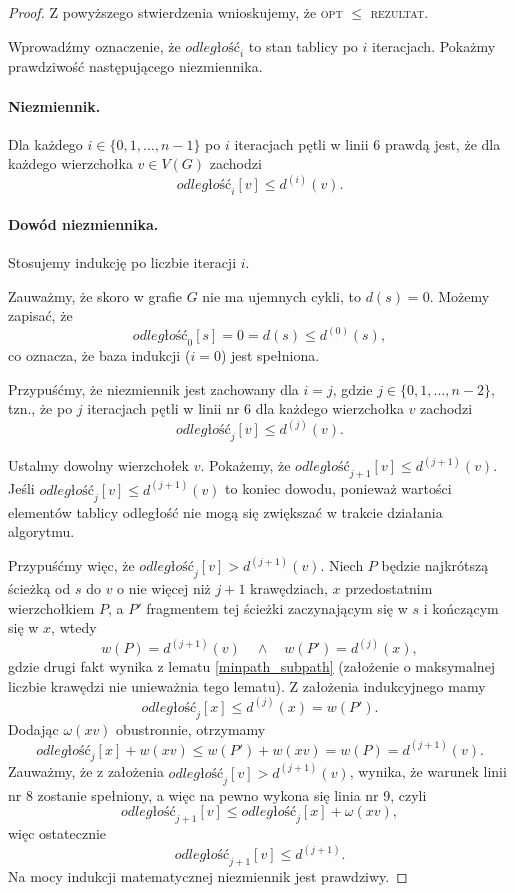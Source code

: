 \begin{theorem}
\begin{proof}
		Z powyższego stwierdzenia wnioskujemy, że
		\textsc{opt} $\leq$ \textsc{rezultat}. 
		
		Wprowadźmy oznaczenie, że $\textit{odległość}_i$ to 
		stan tablicy po $i$ iteracjach.
		Pokażmy prawdziwość następującego 
		niezmiennika. 
		
		\paragraph{Niezmiennik.} Dla każdego 
		$i \in \{0,1, \dots, n-1\}$ po $i$ iteracjach
		pętli w linii 6 prawdą jest, że dla każdego 
		wierzchołka $v \in V(G)$ zachodzi
		\[\textit{odległość}_i[v] \leq d^{(i)}(v).\]
		
		\paragraph{Dowód niezmiennika.} Stosujemy indukcję
		po liczbie iteracji $i$. 
		
		Zauważmy, że skoro w grafie $G$ nie ma ujemnych 
		cykli, to $d(s) = 0$. Możemy zapisać, że
		\[\textit{odległość}_0[s] = 0 = d(s) \leq d^{(0)}(s),\]
		co oznacza, że baza indukcji ($i=0$) jest spełniona.
		
		Przypuśćmy, że niezmiennik jest zachowany dla $i=j$,
		gdzie $j\in \{0, 1, \dots, n-2\}$, tzn., że po $j$
		iteracjach pętli w linii nr 6 dla każdego wierzchołka
		$v$ zachodzi
		\[\textit{odległość}_j[v] \leq d^{(j)}(v).\]
		
		Ustalmy dowolny wierzchołek $v$. Pokażemy, że
		$\textit{odległość}_{j+1}[v] \leq d^{(j+1)}(v)$. Jeśli
		$\textit{odległość}_j[v] \leq d^{(j+1)}(v)$ to koniec dowodu, 
		ponieważ wartości elementów tablicy odległość
		nie mogą się zwiększać w trakcie działania algorytmu.
		
		Przypuśćmy więc, że $\textit{odległość}_j[v] > d^{(j+1)}(v)$.
		Niech $P$ będzie najkrótszą ścieżką od $s$ do $v$
		o nie więcej niż $j+1$ krawędziach, $x$ przedostatnim 
		wierzchołkiem $P$, a $P'$ fragmentem tej ścieżki
		zaczynającym się w $s$ i kończącym się w $x$, wtedy
		\[w(P) = d^{(j+1)}(v) \quad \land \quad w(P') = d^{(j)}(x),\]
		gdzie drugi fakt wynika z lematu \ref{minpath_subpath} (założenie o maksymalnej liczbie krawędzi nie unieważnia
		tego lematu).
		Z założenia indukcyjnego mamy
		\[\textit{odległość}_j[x] \leq d^{(j)}(x)=w(P').\]
		Dodając $\omega(xv)$ obustronnie, otrzymamy
		\[\textit{odległość}_j[x] + w(xv) \leq w(P') 
		+ w(xv) = w(P) = d^{(j+1)}(v).\]
		Zauważmy, że z założenia $\textit{odległość}_j[v] > d^{(j+1)}(v)$,
		wynika, że warunek linii nr 8 zostanie spełniony,
		a więc na pewno wykona się linia nr 9, czyli
		\[\textit{odległość}_{j+1}[v]\leq 
		\textit{odległość}_j[x] + \omega(xv),\]
		więc ostatecznie
		\[\textit{odległość}_{j+1}[v]\leq d^{(j+1)}.\]
		Na mocy indukcji matematycznej niezmiennik jest prawdziwy.
		

\end{proof}
\end{theorem}
